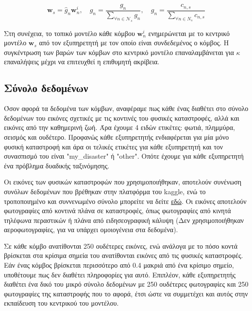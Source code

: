 \vspace{-5pt}

\begin{equation}
   \mathbf{w}_s = \hat{g}_n \mathbf{w}_n^i, \quad \hat{g}_n = \frac{g_n}{\sum\limits_{\forall n \in \mathcal{N}_s} g_n}, \quad g_n = \frac{c_{n,s}}{\sum\limits_{\forall n \in N_s} c_{n,s}}
    \label{eq15}
\end{equation}

\vspace{-5pt}

Στη συνέχεια, το τοπικό μοντέλο κάθε κόμβου $\mathbf{w}_n^i$ ενημερώνεται με το κεντρικό μοντέλο $\mathbf{w}_s$ από τον εξυπηρετητή με τον οποίο είναι συνδεδεμένος ο κόμβος. Η συγκέντρωση των βαρών των κόμβων στο κεντρικό μοντέλο επαναλαμβάνεται για $\kappa$ επαναλήψεις μέχρι να επιτευχθεί η επιθυμητή ακρίβεια.

\subsection{Σύνολο δεδομένων}

Όσον αφορά τα δεδομένα των κόμβων, αναφέραμε πως κάθε ένας διαθέτει στο σύνολο δεδομένων του εικόνες σχετικές με τις κοντινές του φυσικές καταστροφές, αλλά και εικόνες από την καθημερινή ζωή. Άρα έχουμε 4 ειδών ετικέτες: φωτιά, πλημμύρα, σεισμός και ουδέτερο. Προφανώς κάθε εξυπηρετητής ενδιαφέρεται για μία μόνο φυσική καταστροφή και άρα οι τελικές ετικέτες για κάθε εξυπηρετητή και τον συνασπισμό του είναι "my\_disaster" ή "other". Οπότε έχουμε για κάθε εξυπηρετητή ένα πρόβλημα δυαδικής ταξινόμησης.

Οι εικόνες των φυσικών καταστροφών που χρησιμοποιήθηκαν, αποτελούν συνένωση συνόλων δεδομένων που βρέθηκαν στην πλατφόρμα του kaggle, ενώ το τροποποιημένο και συννενωμένο σύνολο μπορείτε να δείτε \underline{εδώ}. Οι εικόνες αποτελούν φωτογραφίες από κοντινά πλάνα σε καταστροφές, όπως φωτογραφίες από κινητά τηλέφωνα περαστικών ή πλάνα από ειδησεογραφική κάλυψη (Δεν χρησιμοποιήθηκαν αεροφωτογραφίες, για να υπάρχει ομοιογένεια στα δεδομένα).

Σε κάθε κόμβο ανατίθονται 250 ουδέτερες εικόνες, ενώ ανάλογα με το πόσο κοντά βρίσκεται στα κρίσιμα σημεία του ανατίθονται εικόνες από τις φυσικές καταστροφές. Εάν ένας κόμβος βρίσκεται περισσότερο από 0.4 μακριά από ένα κρίσιμο σημείο, υποθέτουμε πως δεν διαθέτει πληροφορίες για αυτό. Επιπλέον, κάθε εξυπηρετητής διαθέτει ένα δικό του μικρό σύνολο δεδομένων με 250 ουδέτερες φωτογραφίες και 250 φωτογραφίες της καταστροφής που το αφορά, έτσι ώστε να συμμετέχει και αυτός στην εκπαίδευση του κεντρικού του μοντέλου.

